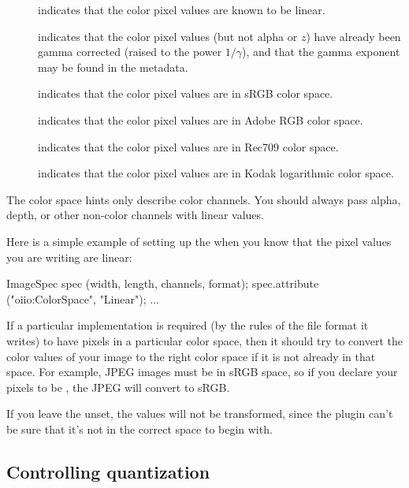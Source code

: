 \begin{description}
\item[\halfspc \rm {}] indicates that the
  color pixel values are known to be linear.
\item[\halfspc \rm {}] indicates
  that the color pixel values (but not alpha or $z$) have
  already been gamma corrected (raised to the power $1/\gamma$), and
  that the gamma exponent may be found in the  metadata.
\item[\halfspc \rm {}] indicates that the
  color pixel values are in sRGB color space.
\item[\halfspc \rm {}] indicates that the
  color pixel values are in Adobe RGB color space.
\item[\halfspc \rm {}] indicates that the
  color pixel values are in Rec709 color space.
\item[\halfspc \rm {}] indicates that the
  color pixel values are in Kodak logarithmic color space.
\end{description}

\noindent The color space hints only describe color channels.  You should always
pass alpha, depth, or other non-color channels with linear values.

Here is a simple example of setting up the \ImageSpec
when you know that the pixel values you are writing are linear:

\begin{code}
        ImageSpec spec (width, length, channels, format);
        spec.attribute ("oiio:ColorSpace", "Linear");
        ...
\end{code}

If a particular \ImageOutput implementation is required (by the rules of
the file format it writes) to have pixels in a particular color space,
then it should try to convert the color values of your image to the right color
space if it is not already in that space.  For example, JPEG images
must be in sRGB space, so if you declare your pixels to be ,
the JPEG \ImageOutput will convert to sRGB.

If you leave the  unset, the values will not be
transformed, since the plugin can't be sure that it's not in the correct
space to begin with.



\subsection{Controlling quantization}
\label{sec:imageoutput:quantization}

